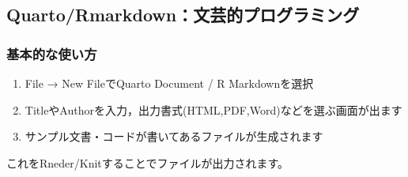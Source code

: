 \documentclass[
  a4paper,
]{ltjsbook}
\providecommand{\tightlist}{%
  \setlength{\itemsep}{0pt}\setlength{\parskip}{0pt}}\usepackage{longtable,booktabs,array}
\begin{document}
\subsection{Quarto/Rmarkdown：文芸的プログラミング}\label{quartormarkdownux6587ux82b8ux7684ux30d7ux30edux30b0ux30e9ux30dfux30f3ux30b0-1}

\subsubsection{基本的な使い方}\label{ux57faux672cux7684ux306aux4f7fux3044ux65b9-1}

\begin{enumerate}
\def\labelenumi{\arabic{enumi}.}
\tightlist
\item
  File → New FileでQuarto Document / R Markdownを選択
\item
  TitleやAuthorを入力，出力書式(HTML,PDF,Word)などを選ぶ画面が出ます
\item
  サンプル文書・コードが書いてあるファイルが生成されます
\end{enumerate}

これをRneder/Knitすることでファイルが出力されます。
\end{document}
